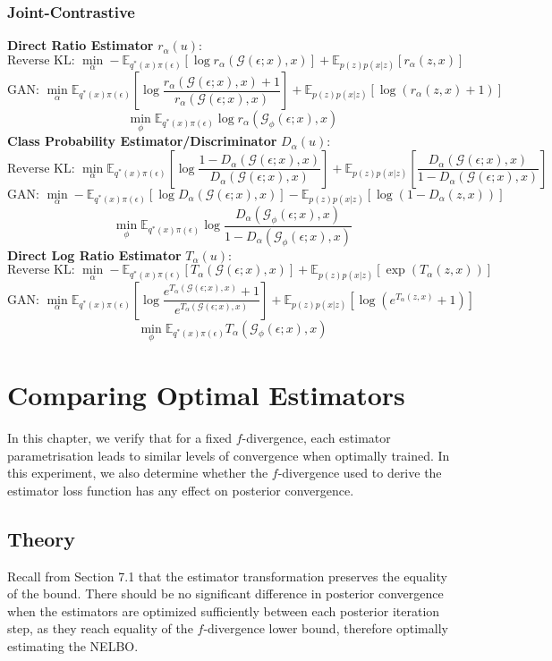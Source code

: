 \documentclass[honours,12pt]{unswthesis}
\newcommand{\E}{\mathbb{E}}
\numberwithin{equation}{section}
\theoremstyle{definition}
\begin{document}
\subsection{Joint-Contrastive}
\textbf{Direct Ratio Estimator} $r_\alpha(u)$:
\[\text{Reverse KL: }\min_\alpha -\E_{q^*(x)\pi(\epsilon)}[\log r_\alpha(\mathcal{G}(\epsilon;x),x)]+\E_{p(z)p(x|z)}[r_\alpha(z,x)]\]
\[\text{GAN: }\min_\alpha \E_{q^*(x)\pi(\epsilon)}\left[\log \frac{r_\alpha(\mathcal{G}(\epsilon;x),x)+1}{r_\alpha(\mathcal{G}(\epsilon;x),x)}\right]+\E_{p(z)p(x|z)}[\log(r_\alpha(z,x)+1)]\]
\[\min_\phi \E_{q^*(x)\pi(\epsilon)}\log r_\alpha(\mathcal{G}_\phi(\epsilon;x),x)\]
\textbf{Class Probability Estimator/Discriminator} $D_\alpha(u)$:
\[\text{Reverse KL: }\min_\alpha \E_{q^*(x)\pi(\epsilon)}\left[\log \frac{1-D_\alpha(\mathcal{G}(\epsilon;x),x)}{D_\alpha(\mathcal{G}(\epsilon;x),x)}\right]+\E_{p(z)p(x|z)}\left[\frac{D_\alpha(\mathcal{G}(\epsilon;x),x)}{1-D_\alpha(\mathcal{G}(\epsilon;x),x)}\right]\]
\[\text{GAN: }\min_\alpha -\E_{q^*(x)\pi(\epsilon)}[\log D_\alpha(\mathcal{G}(\epsilon;x),x)]-\E_{p(z)p(x|z)}[\log(1-D_\alpha(z,x))]\]
\[\min_\phi \E_{q^*(x)\pi(\epsilon)}\log \frac{D_\alpha(\mathcal{G}_\phi(\epsilon;x),x)}{1-D_\alpha(\mathcal{G}_\phi(\epsilon;x),x)}\]
\textbf{Direct Log Ratio Estimator} $T_\alpha(u)$:
\[\text{Reverse KL: }\min_\alpha -\E_{q^*(x)\pi(\epsilon)}[T_\alpha(\mathcal{G}(\epsilon;x),x)]+\E_{p(z)p(x|z)}[\exp(T_\alpha(z,x))]\]
\[\text{GAN: }\min_\alpha \E_{q^*(x)\pi(\epsilon)}\left[\log \frac{e^{T_\alpha(\mathcal{G}(\epsilon;x),x)}+1}{e^{T_\alpha(\mathcal{G}(\epsilon;x),x)}}\right]+\E_{p(z)p(x|z)}[\log(e^{T_\alpha(z,x)}+1)]\]
\[\min_\phi \E_{q^*(x)\pi(\epsilon)}T_\alpha(\mathcal{G}_\phi(\epsilon;x),x)\]
\chapter{Comparing Optimal Estimators}
In this chapter, we verify that for a fixed $f$-divergence, each estimator parametrisation leads to similar levels of convergence when optimally trained. In this experiment, we also determine whether the $f$-divergence used to derive the estimator loss function has any effect on posterior convergence.
\section{Theory}
Recall from Section 7.1 that the estimator transformation preserves the equality of the bound. There should be no significant difference in posterior convergence when the estimators are optimized sufficiently between each posterior iteration step, as they reach equality of the $f$-divergence lower bound, therefore optimally estimating the NELBO.
\end{document}
